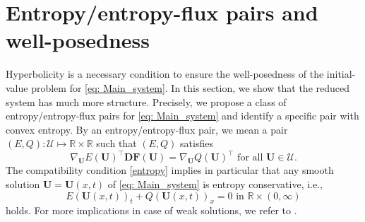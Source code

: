 \documentclass[11pt]{article}
\numberwithin{equation}{section}
\newtheorem{counter example}[theorem]{Counter Example}
\begin{document}
{\section{Entropy/entropy-flux pairs and  well-posedness}\label{sec: 4}
Hyperbolicity is a necessary condition to ensure the well-posedness of the initial-value problem for \eqref{eq: Main_system}.  In this section, we show that the reduced system has much more structure.
Precisely, we propose a class of entropy/entropy-flux pairs for \eqref{eq: Main_system} and identify a specific pair with convex entropy. By an entropy/entropy-flux pair, we mean a pair 
$(E, Q): \mathcal{U}\mapsto \mathbb{R}\times \mathbb{R}$ such that $(E, Q)$ satisfies 
\begin{equation}\label{entropy}
\nabla_{\mathbf{U}} E(\mathbf{U})^\top\mathbf{DF(U)}=\nabla_{\mathbf{U}}Q(\mathbf{U})^\top
 \text{ for all $\mathbf{U}\in \mathcal U$}.
\end{equation}
The compatibility condition \eqref{entropy} implies in particular that any smooth solution $\mathbf{U}=\mathbf{U}(x,t)$ of \eqref{eq: Main_system} is entropy conservative, i.e., 
\[{E(\mathbf{U}(x,t))}_t+{Q(\mathbf{U}(x,t))}_x=0 \mbox{ in $\mathbb{R}\times(0,\infty)$}
\] holds. For more implications in case of weak solutions, we refer to \cite{dafermos2005hyperbolic,serre1999systems}.
}
\end{document}
